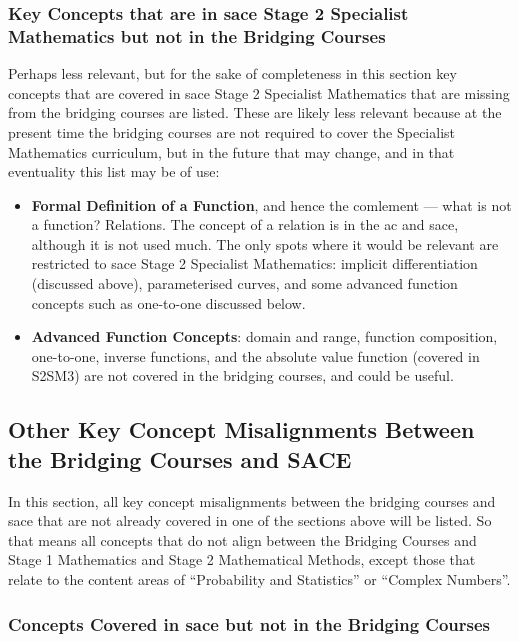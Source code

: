 \documentclass[twoside,12pt,a4paper]{report}
\begin{document}
\subsubsection{Key Concepts that are in \gls{sace} Stage 2 Specialist Mathematics but not in the Bridging Courses}

Perhaps less relevant, but for the sake of completeness in this section key concepts that are covered in \gls{sace} Stage 2 Specialist Mathematics that are missing from the bridging courses are listed. These are likely less relevant because at the present time the bridging courses are not required to cover the Specialist Mathematics curriculum, but in the future that may change, and in that eventuality this list may be of use:

\begin{itemize}
	\item \textbf{Formal Definition of a Function}, and hence the comlement --- what is not a function? Relations. The concept of a relation is in the \gls{ac} and \gls{sace}, although it is not used much. The only spots where it would be relevant are restricted to \gls{sace} Stage 2 Specialist Mathematics: implicit differentiation (discussed above), parameterised curves, and some advanced function concepts such as one-to-one discussed below. 
	\item \textbf{Advanced Function Concepts}: domain and range, function composition, one-to-one, inverse functions, and the absolute value function (covered in S2SM3) are not covered in the bridging courses, and could be useful.
\end{itemize}


\subsection{Other Key Concept Misalignments Between the Bridging Courses and SACE}

In this section, all key concept misalignments between the bridging courses and \gls{sace} that are not already covered in one of the sections above will be listed. So that means all concepts that do not align between the Bridging Courses and Stage 1 Mathematics and Stage 2 Mathematical Methods, except those that relate to the content areas of ``Probability and Statistics'' or ``Complex Numbers''. 

\subsubsection{Concepts Covered in \gls{sace} but not in the Bridging Courses}
\end{document}
